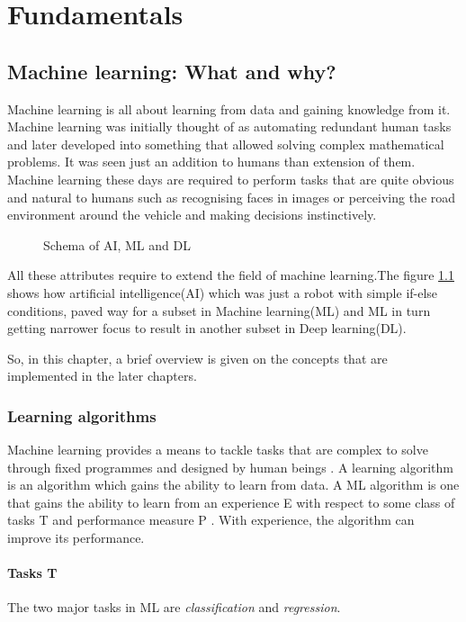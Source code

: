 \chapter{Fundamentals}
\label{chapter:fundamentals}
\section{Machine learning: What and why?}
Machine learning is all about learning from data and gaining knowledge from it. Machine learning was initially thought of as automating
redundant human tasks and later developed into something that allowed solving complex
mathematical problems. It was seen just an addition to humans than extension of them.
Machine learning these days are required to perform tasks that are quite obvious and
natural to humans such as recognising faces in images or perceiving the road environment
around the vehicle and making decisions instinctively.

\begin{figure}
	\centering
    \def\svgwidth{0.5\textwidth}
    \caption{Schema of AI, ML and DL}
    \label{fig:ai_ml_dl}
\end{figure}


All these attributes require to extend the field of machine learning.The figure \ref{fig:ai_ml_dl} shows how artificial
intelligence(AI) which was just a robot with simple if-else conditions, paved way for a
subset in Machine learning(ML) and ML in turn getting narrower focus to result in another
subset in Deep learning(DL).

So, in this chapter, a brief overview is given on the concepts that are implemented in the later chapters.

\subsection{Learning algorithms}
Machine learning provides a means to tackle tasks that are complex to solve through fixed
programmes and designed by human beings \cite{Goodfellow-et-al-2016}. A learning algorithm
is an algorithm which gains the ability to learn from data. A ML algorithm is one that
gains the ability to learn from an experience E with respect to some class of tasks T and
performance measure P \cite{mitchell1996m}. With experience, the algorithm can improve its
performance.

\subsubsection*{Tasks T}
The two major tasks in ML are \textit{classification} and \textit{regression}.


